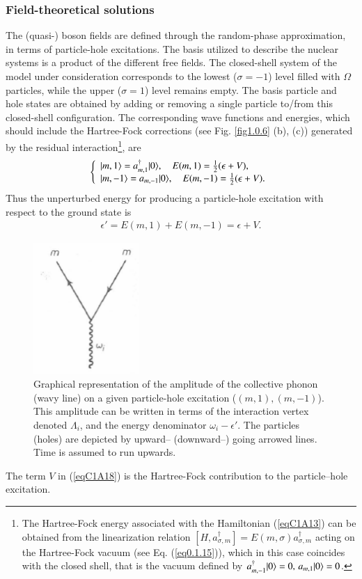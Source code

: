 \subsubsection{Field-theoretical solutions}
 The (quasi-) boson fields are defined through the  random-phase
approximation, in terms of particle-hole excitations. The basis utilized to
describe the nuclear systems is a product of the different free fields. 
The closed-shell system of the  model under consideration corresponds to the lowest ($\sigma = - 1$) level filled with $\Omega$ particles, while the upper
($\sigma =  1$) level remains empty. The basis particle and hole states are obtained
by adding or removing a single particle to/from this closed-shell configuration.
The corresponding wave functions and energies, which should include the
Hartree-Fock corrections (see Fig. \ref{fig1.0.6} (b), (c)) generated by the residual interaction\footnote{The Hartree-Fock energy associated with the Hamiltonian (\ref{eqC1A13}) can be obtained
from the linearization relation $[H,a_{\sigma,m}^\dagger]=E(m,\sigma)a^\dagger_{\sigma,m}$ acting on the Hartree-Fock
vacuum (see Eq. (\ref{eq0.1.15})), which in this case coincides with the closed shell,  that is the vacuum defined by
 $a^\dagger_{m,-1}|{0} \rangle=0, \, a_{m,1}|{0} \rangle=0$.}, are
 \begin{align}\label{eqC1A17} 
\left\{\begin{array}{l}
 |{m,1} \rangle=a^\dagger_{m,1}|{0} \rangle,\quad E(m,1)=\frac{1}{2}(\epsilon+V),\\ 
|{m,-1} \rangle=a_{m,-1}|{0} \rangle,\quad E(m,-1)=\frac{1}{2}(\epsilon+V).
\end{array} \right.
 \end{align}
Thus the unperturbed energy for producing a particle-hole excitation with
respect to the ground state is
 \begin{align}\label{eqC1A18} 
\epsilon'=E(m,1)+E(m,-1)=\epsilon+V.
 \end{align}
 \begin{figure}
 \centerline {
 \includegraphics*[width=4cm]{introduccion/figs/fig18}
 }
 \caption[Graphical representation of the amplitude of the collective phonon on a given particle-hole excitation.]{Graphical representation of the amplitude of the collective phonon (wavy line) on a given particle-hole excitation ($(m,1),(m,-1)$). This amplitude can be written in terms of the interaction vertex denoted  $\Lambda_i$, and the energy denominator $\omega_i-\epsilon'$. The particles (holes) are depicted by upward-- (downward--) going arrowed lines. Time is assumed to run upwards.}
 \label{figC1A1}
 \end{figure}
The term $V$ in (\ref{eqC1A18}) is the Hartree-Fock contribution to the particle--hole excitation.

